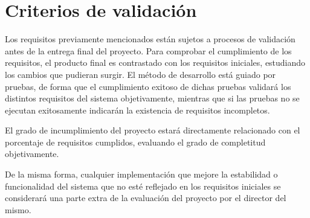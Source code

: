\section{Criterios de validación}

	Los requisitos previamente mencionados están sujetos a procesos de validación antes de la entrega final del proyecto. Para comprobar el cumplimiento de los requisitos, el producto final es contrastado con los requisitos iniciales, estudiando los cambios que pudieran surgir. El método de desarrollo está guiado por pruebas, de forma que el cumplimiento exitoso de dichas pruebas validará los distintos requisitos del sistema objetivamente, mientras que si las pruebas no se ejecutan exitosamente indicarán la existencia de requisitos incompletos.

	El grado de incumplimiento del proyecto estará directamente relacionado con el porcentaje de requisitos cumplidos, evaluando el grado de completitud objetivamente.

	De la misma forma, cualquier implementación que mejore la estabilidad o funcionalidad del sistema que no esté reflejado en los requisitos iniciales se considerará una parte extra de la evaluación del proyecto por el director del mismo.